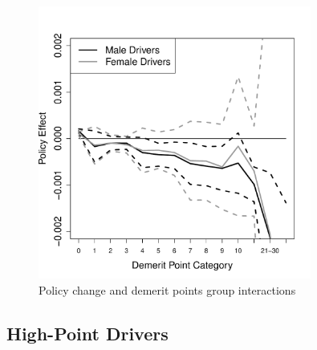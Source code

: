 \documentclass[12pt]{paper}
\begin{document}
\begin{figure}
\centering
\includegraphics[width=0.8\textwidth]{../Figures/FFX_reg_policy_points_grp_all_pts.pdf}
\caption{Policy change and demerit points group interactions}
% 
\label{fig:FE_regs_all_pts}
\end{figure}


\clearpage
\pagebreak
\subsection*{High-Point Drivers}








\end{document}
